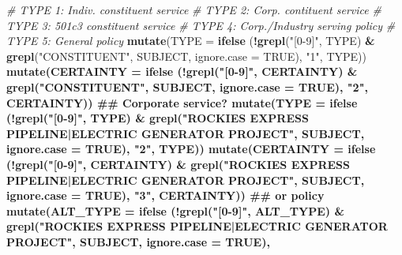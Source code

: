 \documentclass[]{article}
\newenvironment{Shaded}{\begin{snugshade}}{\end{snugshade}}
\newcommand{\KeywordTok}[1]{\textcolor[rgb]{0.13,0.29,0.53}{\textbf{#1}}}
\newcommand{\DataTypeTok}[1]{\textcolor[rgb]{0.13,0.29,0.53}{#1}}
\newcommand{\StringTok}[1]{\textcolor[rgb]{0.31,0.60,0.02}{#1}}
\newcommand{\CommentTok}[1]{\textcolor[rgb]{0.56,0.35,0.01}{\textit{#1}}}
\newcommand{\OtherTok}[1]{\textcolor[rgb]{0.56,0.35,0.01}{#1}}
\newcommand{\OperatorTok}[1]{\textcolor[rgb]{0.81,0.36,0.00}{\textbf{#1}}}
\newcommand{\NormalTok}[1]{#1}
\begin{document}
\begin{Shaded}
\begin{Highlighting}[]
\CommentTok{# TYPE 1: Indiv. constituent service }
\CommentTok{# TYPE 2: Corp. contituent service }
\CommentTok{# TYPE 3: 501c3 constituent service }
\CommentTok{# TYPE 4: Corp./Industry serving policy }
\CommentTok{# TYPE 5: General policy }
  \KeywordTok{mutate}\NormalTok{(}\DataTypeTok{TYPE =} \KeywordTok{ifelse}\NormalTok{ (}\OperatorTok{!}\KeywordTok{grepl}\NormalTok{(}\StringTok{"[0-9]"}\NormalTok{, TYPE) }\OperatorTok{&}\StringTok{ }\KeywordTok{grepl}\NormalTok{(}\StringTok{"CONSTITUENT"}\NormalTok{, SUBJECT, }\DataTypeTok{ignore.case =} \OtherTok{TRUE}\NormalTok{), }
                        \StringTok{"1"}\NormalTok{, TYPE)) }\OperatorTok{%
\StringTok{  }\KeywordTok{mutate}\NormalTok{(}\DataTypeTok{CERTAINTY =} \KeywordTok{ifelse}\NormalTok{ (}\OperatorTok{!}\KeywordTok{grepl}\NormalTok{(}\StringTok{"[0-9]"}\NormalTok{, CERTAINTY) }\OperatorTok{&}\StringTok{ }\KeywordTok{grepl}\NormalTok{(}\StringTok{"CONSTITUENT"}\NormalTok{, SUBJECT, }\DataTypeTok{ignore.case =} \OtherTok{TRUE}\NormalTok{), }
                             \StringTok{"2"}\NormalTok{, CERTAINTY)) }\OperatorTok{%
\StringTok{  }\NormalTok{## Corporate service?}
\StringTok{  }\KeywordTok{mutate}\NormalTok{(}\DataTypeTok{TYPE =} \KeywordTok{ifelse}\NormalTok{ (}\OperatorTok{!}\KeywordTok{grepl}\NormalTok{(}\StringTok{"[0-9]"}\NormalTok{, TYPE) }\OperatorTok{&}\StringTok{ }\KeywordTok{grepl}\NormalTok{(}\StringTok{"ROCKIES EXPRESS PIPELINE|ELECTRIC GENERATOR PROJECT"}\NormalTok{, SUBJECT, }\DataTypeTok{ignore.case =} \OtherTok{TRUE}\NormalTok{), }
                        \StringTok{"2"}\NormalTok{, TYPE)) }\OperatorTok{%
\StringTok{  }\KeywordTok{mutate}\NormalTok{(}\DataTypeTok{CERTAINTY =} \KeywordTok{ifelse}\NormalTok{ (}\OperatorTok{!}\KeywordTok{grepl}\NormalTok{(}\StringTok{"[0-9]"}\NormalTok{, CERTAINTY) }\OperatorTok{&}\StringTok{ }\KeywordTok{grepl}\NormalTok{(}\StringTok{"ROCKIES EXPRESS PIPELINE|ELECTRIC GENERATOR PROJECT"}\NormalTok{, SUBJECT, }\DataTypeTok{ignore.case =} \OtherTok{TRUE}\NormalTok{), }
                             \StringTok{"3"}\NormalTok{, CERTAINTY)) }\OperatorTok{%
\StringTok{  }\NormalTok{## or policy}
\StringTok{  }\KeywordTok{mutate}\NormalTok{(}\DataTypeTok{ALT_TYPE =} \KeywordTok{ifelse}\NormalTok{ (}\OperatorTok{!}\KeywordTok{grepl}\NormalTok{(}\StringTok{"[0-9]"}\NormalTok{, ALT_TYPE) }\OperatorTok{&}\StringTok{ }\KeywordTok{grepl}\NormalTok{(}\StringTok{"ROCKIES EXPRESS PIPELINE|ELECTRIC GENERATOR PROJECT"}\NormalTok{, SUBJECT, }\DataTypeTok{ignore.case =} \OtherTok{TRUE}\NormalTok{), }
}}}}
\end{Highlighting}
\end{Shaded}
\end{document}
